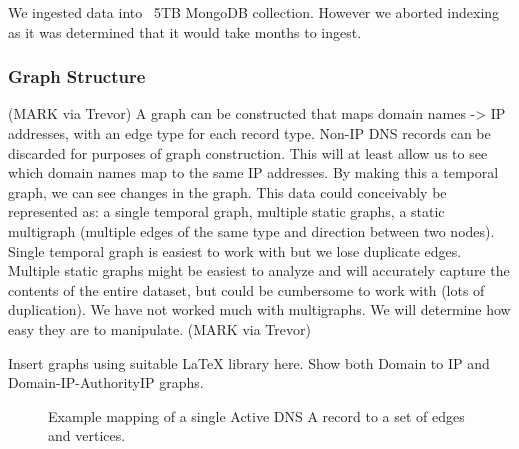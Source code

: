 \documentclass{acm_proc_article-sp}
\begin{document}
We ingested data into ~5TB MongoDB collection.  However we aborted indexing as it was determined that it would take months to ingest.



\subsubsection{Graph Structure}


(MARK via Trevor)
A graph can be constructed that maps domain names -> IP addresses, with an edge type for each record type. Non-IP DNS records can be discarded for purposes of graph construction. This will at least allow us to see which domain names map to the same IP addresses. By making this a temporal graph, we can see changes in the graph. This data could conceivably be represented as: a single temporal graph, multiple static graphs, a static multigraph (multiple edges of the same type and direction between two nodes). Single temporal graph is easiest to work with but we lose duplicate edges. Multiple static graphs might be easiest to analyze and will accurately capture the contents of the entire dataset, but could be cumbersome to work with (lots of duplication). We have not worked much with multigraphs.  We will determine how easy they are to manipulate.
(MARK via Trevor)

Insert graphs using suitable LaTeX library here. Show both Domain to IP and Domain-IP-AuthorityIP graphs.

\begin{figure}
    \usetikzlibrary{arrows.meta}
\caption{
Example mapping of a single Active DNS A record to a set of edges and vertices.}
\label{fig:my_label}
\end{figure}
\end{document}
